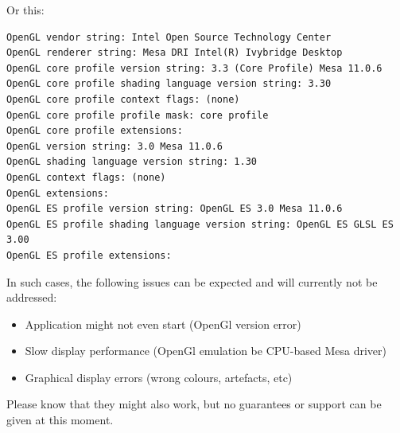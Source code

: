 Or this:

\begin{verbatim}
OpenGL vendor string: Intel Open Source Technology Center
OpenGL renderer string: Mesa DRI Intel(R) Ivybridge Desktop 
OpenGL core profile version string: 3.3 (Core Profile) Mesa 11.0.6
OpenGL core profile shading language version string: 3.30
OpenGL core profile context flags: (none)
OpenGL core profile profile mask: core profile
OpenGL core profile extensions:
OpenGL version string: 3.0 Mesa 11.0.6
OpenGL shading language version string: 1.30
OpenGL context flags: (none)
OpenGL extensions:
OpenGL ES profile version string: OpenGL ES 3.0 Mesa 11.0.6
OpenGL ES profile shading language version string: OpenGL ES GLSL ES 3.00
OpenGL ES profile extensions:
\end{verbatim}

In such cases, the following issues can be expected and will currently not be addressed:

\begin{itemize} 
\item Application might not even start (OpenGl version error)
\item Slow display performance (OpenGl emulation be CPU-based Mesa driver)
\item Graphical display errors (wrong colours, artefacts, etc) 
\end{itemize} 

Please know that they might also work, but no guarantees or support can be given at this moment. 
